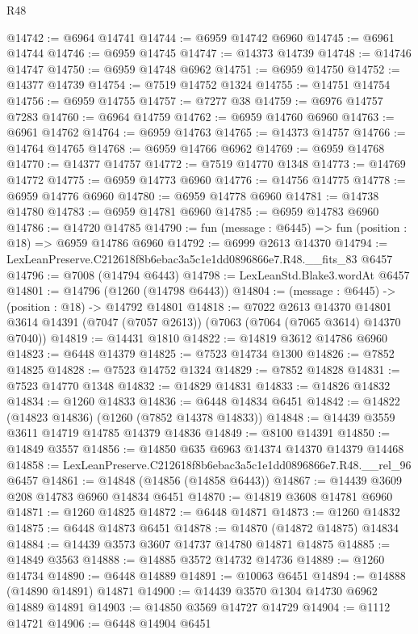 \begin{lexlean}{R48}
\begin{coremodule}
@14742 := @6964 @14741
@14744 := @6959 @14742 @6960
@14745 := @6961 @14744
@14746 := @6959 @14745
@14747 := @14373 @14739
@14748 := @14746 @14747
@14750 := @6959 @14748 @6962
@14751 := @6959 @14750
@14752 := @14377 @14739
@14754 := @7519 @14752 @1324
@14755 := @14751 @14754
@14756 := @6959 @14755
@14757 := @7277 @38
@14759 := @6976 @14757 @7283
@14760 := @6964 @14759
@14762 := @6959 @14760 @6960
@14763 := @6961 @14762
@14764 := @6959 @14763
@14765 := @14373 @14757
@14766 := @14764 @14765
@14768 := @6959 @14766 @6962
@14769 := @6959 @14768
@14770 := @14377 @14757
@14772 := @7519 @14770 @1348
@14773 := @14769 @14772
@14775 := @6959 @14773 @6960
@14776 := @14756 @14775
@14778 := @6959 @14776 @6960
@14780 := @6959 @14778 @6960
@14781 := @14738 @14780
@14783 := @6959 @14781 @6960
@14785 := @6959 @14783 @6960
@14786 := @14720 @14785
@14790 := fun (message : @6445) => fun (position : @18) => @6959 @14786 @6960
@14792 := @6999 @2613 @14370
@14794 := LexLeanPreserve.C212618f8b6ebac3a5c1e1dd0896866e7.R48.__fits_83 @6457
@14796 := @7008 (@14794 @6443)
@14798 := LexLeanStd.Blake3.wordAt @6457
@14801 := @14796 (@1260 (@14798 @6443))
@14804 := (message : @6445) -> (position : @18) -> @14792 @14801
@14818 := @7022
    @2613
    @14370
    @14801
    @3614
    @14391
    (@7047 (@7057 @2613))
    (@7063 (@7064 (@7065 @3614) @14370 @7040))
@14819 := @14431 @1810
@14822 := @14819 @3612 @14786 @6960
@14823 := @6448 @14379
@14825 := @7523 @14734 @1300
@14826 := @7852 @14825
@14828 := @7523 @14752 @1324
@14829 := @7852 @14828
@14831 := @7523 @14770 @1348
@14832 := @14829 @14831
@14833 := @14826 @14832
@14834 := @1260 @14833
@14836 := @6448 @14834 @6451
@14842 := @14822 (@14823 @14836) (@1260 (@7852 @14378 @14833))
@14848 := @14439 @3559 @3611 @14719 @14785 @14379 @14836
@14849 := @8100 @14391
@14850 := @14849 @3557
@14856 := @14850 @635 @6963 @14374 @14370 @14379 @14468
@14858 := LexLeanPreserve.C212618f8b6ebac3a5c1e1dd0896866e7.R48.__rel_96 @6457
@14861 := @14848 (@14856 (@14858 @6443))
@14867 := @14439 @3609 @208 @14783 @6960 @14834 @6451
@14870 := @14819 @3608 @14781 @6960
@14871 := @1260 @14825
@14872 := @6448 @14871
@14873 := @1260 @14832
@14875 := @6448 @14873 @6451
@14878 := @14870 (@14872 @14875) @14834
@14884 := @14439 @3573 @3607 @14737 @14780 @14871 @14875
@14885 := @14849 @3563
@14888 := @14885 @3572 @14732 @14736
@14889 := @1260 @14734
@14890 := @6448 @14889
@14891 := @10063 @6451
@14894 := @14888 (@14890 @14891) @14871
@14900 := @14439 @3570 @1304 @14730 @6962 @14889 @14891
@14903 := @14850 @3569 @14727 @14729
@14904 := @1112 @14721
@14906 := @6448 @14904 @6451

\end{coremodule}
\end{lexlean}
